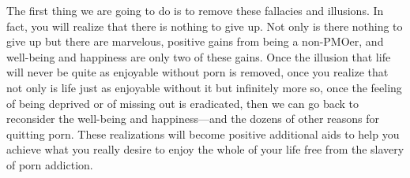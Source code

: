 \documentclass[easypeasy.tex]{subfiles}
\begin{document}
The first thing we are going to do is to remove these fallacies and illusions. In fact, you will realize that there is nothing to give up. Not only is there nothing to give up but there are marvelous, positive gains from being a non-PMOer, and well-being and happiness are only two of these gains. Once the illusion that life will never be quite as enjoyable without porn is removed, once you realize that not only is life just as enjoyable without it but infinitely more so, once the feeling of being deprived or of missing out is eradicated, then we can go back to reconsider the well-being and happiness—and the dozens of other reasons for quitting porn. These realizations will become positive additional aids to help you achieve what you really desire to enjoy the whole of your life free from the slavery of porn addiction.
\end{document}

